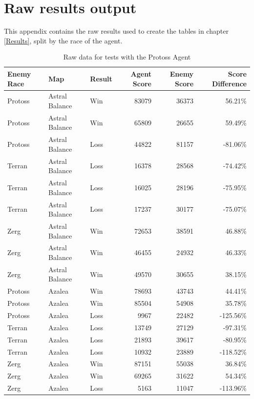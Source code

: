\documentclass[11pt,openright,a4paper]{report}
\begin{document}
\chapter{Raw results output}
This appendix contains the raw results used to create the tables in chapter \ref{Results}, split by the race of the agent.
\label{appData}
\begin{table}[h]
  \centering
  \begin{tabular}{| l | l | l | r | r | r |}
    \hline
    Enemy Race & Map & Result & Agent Score & Enemy Score & Score Difference \\ \hline
    Protoss & Astral Balance & Win & 83079 & 36373 & 56.21\% \\ \hline
    Protoss & Astral Balance & Win & 65809 & 26655 & 59.49\% \\ \hline
    Protoss & Astral Balance & Loss & 44822 & 81157 & -81.06\% \\ \hline
    Terran & Astral Balance & Loss & 16378 & 28568 & -74.42\% \\ \hline
    Terran & Astral Balance & Loss & 16025 & 28196 & -75.95\% \\ \hline
    Terran & Astral Balance & Loss & 17237 & 30177 & -75.07\% \\ \hline
    Zerg & Astral Balance & Win & 72653 & 38591 & 46.88\% \\ \hline
    Zerg & Astral Balance & Win & 46455 & 24932 & 46.33\% \\ \hline
    Zerg & Astral Balance & Win & 49570 & 30655 & 38.15\% \\ \hline
    Protoss & Azalea & Win & 78693 & 43743 & 44.41\% \\ \hline
    Protoss & Azalea & Win & 85504 & 54908 & 35.78\% \\ \hline
    Protoss & Azalea & Loss & 9967 & 22482 & -125.56\% \\ \hline
    Terran & Azalea & Loss & 13749 & 27129 & -97.31\% \\ \hline
    Terran & Azalea & Loss & 21893 & 39617 & -80.95\% \\ \hline
    Terran & Azalea & Loss & 10932 & 23889 & -118.52\% \\ \hline
    Zerg & Azalea & Win & 87151 & 55038 & 36.84\% \\ \hline
    Zerg & Azalea & Win & 69265 & 31622 & 54.34\% \\ \hline
    Zerg & Azalea & Loss & 5163 & 11047 & -113.96\% \\ \hline
  \end{tabular}
  \caption{Raw data for tests with the Protoss Agent}
  \label{DataRawProtoss}
\end{table}
\end{document}
